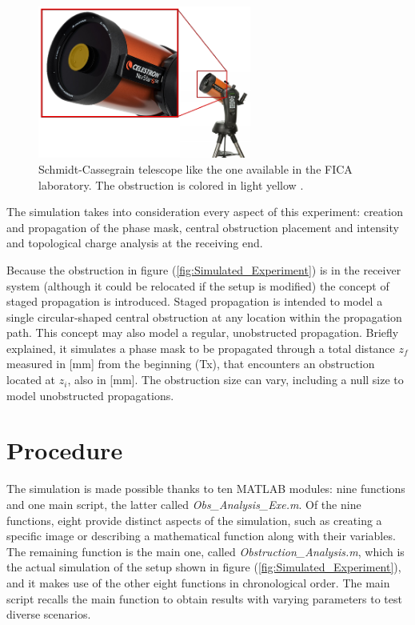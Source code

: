 \begin{figure}[htbp]
    \centering
    \includegraphics[width=7cm]{images/c03/Cassegrain-Obstruction.png}
    \caption{Schmidt-Cassegrain telescope like the one available in the FICA laboratory. The obstruction is colored in light yellow \cite{Schmidt-Cassegrain_Pics}.}
    \label{fig:Schmidt-Cassegrain-Obstruction}
\end{figure}

The simulation takes into consideration every aspect of this experiment: creation and propagation of the phase mask, central obstruction placement and intensity and topological charge analysis at the receiving end.

Because the obstruction in figure (\ref{fig:Simulated_Experiment}) is in the receiver system (although it could be relocated if the setup is modified) the concept of staged propagation is introduced. Staged propagation is intended to model a single circular-shaped central obstruction at any location within the propagation path. This concept may also model a regular, unobstructed propagation. Briefly explained, it simulates a phase mask to be propagated through a total distance $z_f$ measured in [mm] from the beginning (Tx), that encounters an obstruction located at $z_i$, also in [mm]. The obstruction size can vary, including a null size to model unobstructed propagations.

\section{Procedure}
\label{c3:Procedure}

The simulation is made possible thanks to ten MATLAB modules: nine functions and one main script, the latter called \textit{Obs\_Analysis\_Exe.m}. Of the nine functions, eight provide distinct aspects of the simulation, such as creating a specific image or describing a mathematical function along with their variables. The remaining function is the main one, called \textit{Obstruction\_Analysis.m}, which is the actual simulation of the setup shown in figure (\ref{fig:Simulated_Experiment}), and it makes use of the other eight functions in chronological order. The main script recalls the main function to obtain results with varying parameters to test diverse scenarios.

